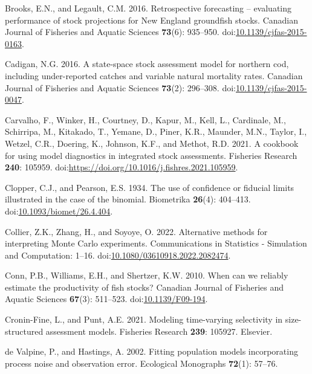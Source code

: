 \documentclass[
  12pt,
]{article}
\newlength{\cslhangindent}
\newenvironment{CSLReferences}[2] %
 {\begin{list}{}{%
  \setlength{\itemindent}{0pt} %
  \setlength{\leftmargin}{0pt} %
  \setlength{\parsep}{0pt} %
  \ifodd #1
   \setlength{\leftmargin}{\cslhangindent} %
   \setlength{\itemindent}{-1\cslhangindent} %
  \fi
  \setlength{\itemsep}{#2\baselineskip}}} %
 {\end{list}} %
\begin{document}
\begin{CSLReferences}{1}{0}
Brooks, E.N., and Legault, C.M. 2016. Retrospective forecasting --
evaluating performance of stock projections for {N}ew {E}ngland
groundfish stocks. Canadian Journal of Fisheries and Aquatic Sciences
\textbf{73}(6): 935--950.
doi:\href{https://doi.org/10.1139/cjfas-2015-0163}{10.1139/cjfas-2015-0163}.

Cadigan, N.G. 2016. A state-space stock assessment model for northern
cod, including under-reported catches and variable natural mortality
rates. Canadian Journal of Fisheries and Aquatic Sciences
\textbf{73}(2): 296--308.
doi:\href{https://doi.org/10.1139/cjfas-2015-0047}{10.1139/cjfas-2015-0047}.

Carvalho, F., Winker, H., Courtney, D., Kapur, M., Kell, L., Cardinale,
M., Schirripa, M., Kitakado, T., Yemane, D., Piner, K.R., Maunder, M.N.,
Taylor, I., Wetzel, C.R., Doering, K., Johnson, K.F., and Methot, R.D.
2021. A cookbook for using model diagnostics in integrated stock
assessments. Fisheries Research \textbf{240}: 105959.
doi:\url{https://doi.org/10.1016/j.fishres.2021.105959}.

Clopper, C.J., and Pearson, E.S. 1934. The use of confidence or fiducial
limits illustrated in the case of the binomial. Biometrika
\textbf{26}(4): 404--413.
doi:\href{https://doi.org/10.1093/biomet/26.4.404}{10.1093/biomet/26.4.404}.

Collier, Z.K., Zhang, H., and Soyoye, O. 2022. Alternative methods for
interpreting {M}onte {C}arlo experiments. Communications in Statistics -
Simulation and Computation: 1--16.
doi:\href{https://doi.org/10.1080/03610918.2022.2082474}{10.1080/03610918.2022.2082474}.

Conn, P.B., Williams, E.H., and Shertzer, K.W. 2010. When can we
reliably estimate the productivity of fish stocks? Canadian Journal of
Fisheries and Aquatic Sciences \textbf{67}(3): 511--523.
doi:\href{https://doi.org/10.1139/F09-194}{10.1139/F09-194}.

Cronin-Fine, L., and Punt, A.E. 2021. Modeling time-varying selectivity
in size-structured assessment models. Fisheries Research \textbf{239}:
105927. Elsevier.

{de Valpine, P., and Hastings, A.} 2002. Fitting population models
incorporating process noise and observation error. Ecological Monographs
\textbf{72}(1): 57--76.


\end{CSLReferences}
\end{document}
